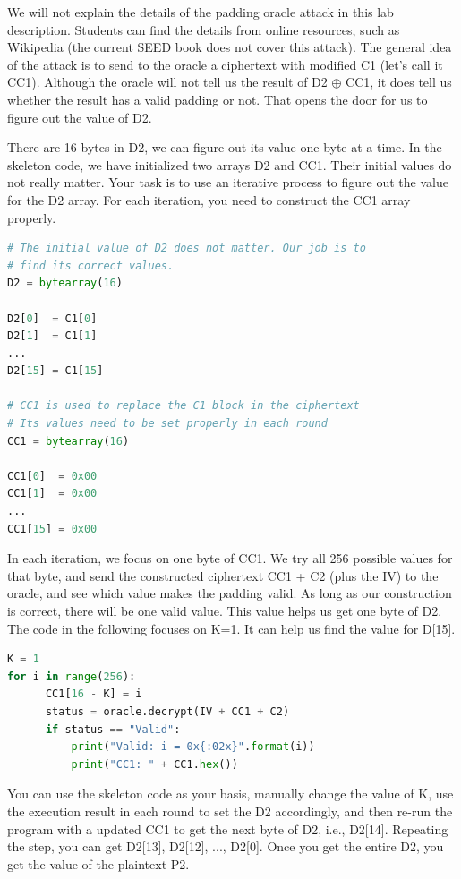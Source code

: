 We will not explain the details of the padding oracle attack
in this lab description. Students can find the details from
online resources, such as Wikipedia (the current SEED book does not 
cover this attack).  The general idea of the attack
is to send to the oracle a ciphertext with modified 
C1 (let's call it CC1). Although the oracle will not tell us the result 
of D2 $\oplus$ CC1, it does tell us whether the result
has a valid padding or not. That opens the door 
for us to figure out the value of D2. 

There are 16 bytes in D2, we can figure out its value one 
byte at a time. In the skeleton code, we have initialized
two arrays D2 and CC1. Their initial values do not really matter.
Your task is to use an iterative process to figure 
out the value for the D2 array. For each iteration, you need 
to construct the CC1 array properly. 

\begin{lstlisting}[language=python]
# The initial value of D2 does not matter. Our job is to 
# find its correct values. 
D2 = bytearray(16)

D2[0]  = C1[0]
D2[1]  = C1[1]
...
D2[15] = C1[15]

# CC1 is used to replace the C1 block in the ciphertext
# Its values need to be set properly in each round
CC1 = bytearray(16)

CC1[0]  = 0x00
CC1[1]  = 0x00
...
CC1[15] = 0x00
\end{lstlisting}

In each iteration, we focus on one byte of CC1.
We try all 256 possible values for that byte, and send the constructed
ciphertext CC1 + C2 (plus the IV) to the oracle, and see
which value makes the padding valid.
As long as our construction is correct, there will be
one valid value. This value helps us get one byte of D2.
The code in the following focuses on K=1. It can 
help us find the value for D[15].

\begin{lstlisting}[language=python]
K = 1
for i in range(256):
      CC1[16 - K] = i
      status = oracle.decrypt(IV + CC1 + C2)
      if status == "Valid":
          print("Valid: i = 0x{:02x}".format(i))
          print("CC1: " + CC1.hex())
\end{lstlisting}
 
You can use the skeleton code as your basis, manually
change the value of K, use the execution result in
each round to set the D2 accordingly, and then
re-run the program with a updated CC1
to get the next byte of D2, i.e., D2[14]. 
Repeating the step, you can get D2[13], D2[12], ..., D2[0].
Once you get the entire D2, you get the value of the plaintext P2. 


